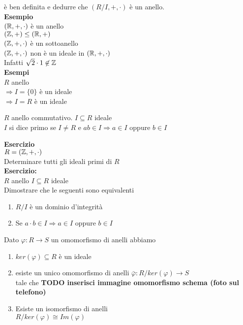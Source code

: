 \documentclass[12px]{article}
\begin{document}
	è ben definita e dedurre che $(R/I,+,\cdot)$ è un anello.\\
	\textbf{Esempio}\\
	$(\mathbb{R},+,\cdot)$ è un anello\\
	 $(\mathbb{Z},+) \leq (\mathbb{R},+)$\\
	  $(\mathbb{Z},+,\cdot)$ è un sottoanello\\
	  $(\mathbb{Z}, +,\cdot)$ non è un ideale in  $(\mathbb{R},+,\cdot)$\\
	  Infatti  $\sqrt 2 \cdot 1\not\in \mathbb{Z}$\\
	   \textbf{Esempi}\\
	   $R$ anello\\
	   $ \Rightarrow  I=\{0\}$ è un ideale\\
	   $ \Rightarrow I=R$ è un ideale\\
	   \begin{defi}
	   	$R$ anello commutativo. $I\subseteq R$ ideale\\
		$I$ si dice primo se $I\neq R$ e $ab\in I \Rightarrow a\in I$ oppure $b\in I$
	   \end{defi}
	   \textbf{Esercizio}\\
	   $R = (\mathbb{Z}, + , \cdot)$\\
	   Determinare tutti gli ideali primi di $R$\\
	   \textbf{Esercizio:}\\
	   $R$ anello $I\subseteq R$ ideale\\
	   Dimostrare che le seguenti sono equivalenti
	    \begin{enumerate}
		    \item $R/I$ è un dominio d'integrità
		    \item  Se $a\cdot b\in I \Rightarrow a\in I$ oppure $b\in I$
	   \end{enumerate}
	   \begin{teo}
	   	Dato $\varphi: R \rightarrow S$ un omomorfismo di anelli abbiamo
		\begin{enumerate}
			\item $ker (\varphi)\subseteq R$ è un ideale
			\item esiste un unico omomorfismo di anelli $\bar \varphi : R/ker(\varphi) \rightarrow S$\\
				tale che  \textbf{TODO inserisci immagine omomorfismo schema (foto sul telefono)}
			\item Esiste un isomorfismo di anelli\\
				$R/ker(\varphi) \cong Im(\varphi)$
		\end{enumerate}
	   \end{teo}
\end{document}
